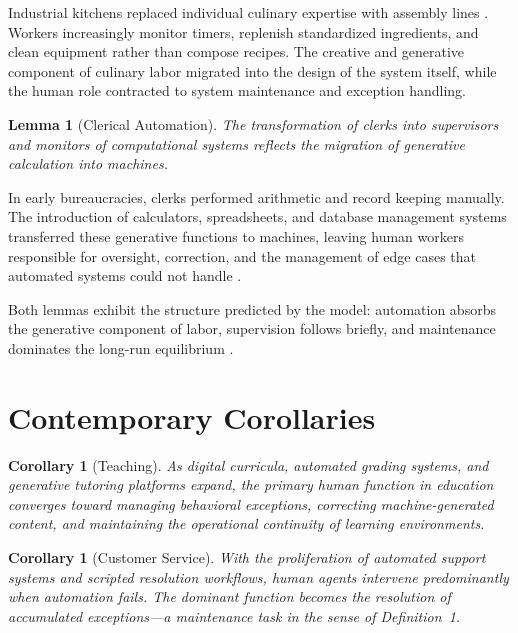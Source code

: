 \documentclass[12pt,a4paper]{article}
\theoremstyle{plain}
\newtheorem{lemma}[theorem]{Lemma}
\newtheorem{corollary}[theorem]{Corollary}
\theoremstyle{definition}
\theoremstyle{remark}
\begin{document}
Industrial kitchens replaced individual culinary expertise with assembly lines \cite{ritzer1993}.
Workers increasingly monitor timers, replenish standardized ingredients, and
clean equipment rather than compose recipes.  The creative and generative
component of culinary labor migrated into the design of the system itself,
while the human role contracted to system maintenance and exception handling.

\begin{lemma}[Clerical Automation]
The transformation of clerks into supervisors and monitors of computational
systems reflects the migration of generative calculation into machines.
\end{lemma}

In early bureaucracies, clerks performed arithmetic and record keeping
manually.  The introduction of calculators, spreadsheets, and database
management systems transferred these generative functions to machines, leaving
human workers responsible for oversight, correction, and the management of
edge cases that automated systems could not handle \cite{autor2015}.

Both lemmas exhibit the structure predicted by the model: automation absorbs
the generative component of labor, supervision follows briefly, and
maintenance dominates the long-run equilibrium \cite{ritzer1993,autor2015}.

\section{Contemporary Corollaries}
\label{sec:corollaries}

\begin{corollary}[Teaching]
As digital curricula, automated grading systems, and generative tutoring
platforms expand, the primary human function in education converges toward
managing behavioral exceptions, correcting machine-generated content, and
maintaining the operational continuity of learning environments.
\end{corollary}

\begin{corollary}[Customer Service]
With the proliferation of automated support systems and scripted resolution
workflows, human agents intervene predominantly when automation fails.  The
dominant function becomes the resolution of accumulated exceptions---a
maintenance task in the sense of Definition~1.
\end{corollary}
\end{document}
